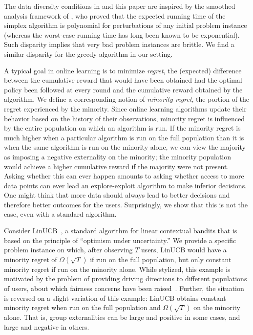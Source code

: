 The data diversity conditions in \citet{kannan2018smoothed} and this paper are inspired by the smoothed analysis framework of \citet{SmoothedAnalysis-jacm04}, who proved that the expected running time of the simplex algorithm is polynomial for perturbations of any initial problem instance (whereas the worst-case running time has long been known to be exponential). Such disparity implies that very bad problem instances are brittle. 
We find a similar disparity for the greedy algorithm in our setting.



  A typical goal in online learning is to minimize \emph{regret}, the (expected) difference between the cumulative reward that would have been obtained had the optimal policy been followed at every round and the cumulative reward obtained by the algorithm.  We define a corresponding notion of \emph{minority regret}, the portion of the regret experienced by the minority.  Since online learning algorithms update their behavior based on the history of their observations, minority regret is influenced by the entire population on which an algorithm is run.  If the minority regret is much higher when a particular algorithm is run on the full population than it is when the same algorithm is run on the minority alone, we can view the majority as imposing a negative externality on the minority; the minority population would achieve a higher cumulative reward if the majority were not present. Asking whether this can ever happen
amounts to asking whether access to more data points can ever lead an explore-exploit algorithm to make inferior decisions. One might think that more data should always lead to better decisions and therefore better outcomes for the users.
Surprisingly, we show that this is not the case, even with a standard algorithm.

Consider LinUCB~\citep{Langford-www10,chu2011contextual,abbasi2011improved}, a standard algorithm for linear contextual bandits that is based on the principle of ``optimism under uncertainty.''  We provide a specific problem instance on which, after observing $T$ users, LinUCB would have a minority regret of $\Omega(\sqrt T)$ if run on the full population, but only constant minority regret if run on the minority alone. While stylized, this example is motivated by the problem of providing driving directions to different populations of users, about which fairness concerns have been raised~\citep{bird2016exploring}. Further, the situation is reversed on a slight variation of this example: LinUCB obtains constant minority regret when run on the full population and $\Omega(\sqrt T)$ on the minority alone.  That is, group externalities can be large and positive in some cases, and large and negative in others.

